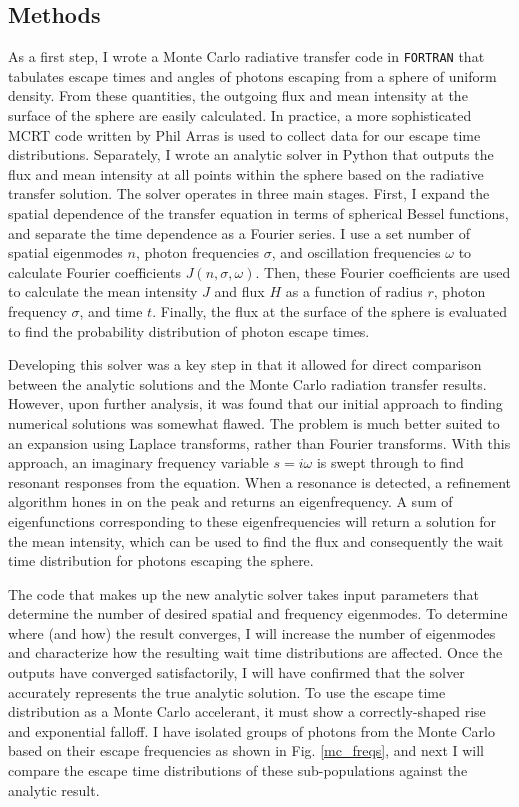 \documentclass[onecolumn]{aastex63}
\begin{document}
\subsection{Methods}

As a first step, I wrote a Monte Carlo radiative transfer code in \texttt{FORTRAN} that tabulates escape times and angles of photons escaping from a sphere of uniform density. From these quantities, the outgoing flux and mean intensity at the surface of the sphere are easily calculated. In practice, a more sophisticated MCRT code written by Phil Arras is used to collect data for our escape time distributions. Separately, I wrote an analytic solver in Python that outputs the flux and mean intensity at all points within the sphere based on the radiative transfer solution. The solver operates in three main stages. First, I expand the spatial dependence of the transfer equation in terms of spherical Bessel functions, and separate the time dependence as a Fourier series. I use a set number of spatial eigenmodes $n$, photon frequencies $\sigma$, and oscillation frequencies $\omega$ to calculate Fourier coefficients $J(n, \sigma, \omega)$. Then, these Fourier coefficients are used to calculate the mean intensity $J$ and flux $H$ as a function of radius $r$, photon frequency $\sigma$, and time $t$. Finally, the flux at the surface of the sphere is evaluated to find the probability distribution of photon escape times.

Developing this solver was a key step in that it allowed for direct comparison between the analytic solutions and the Monte Carlo radiation transfer results. However, upon further analysis, it was found that our initial approach to finding numerical solutions was somewhat flawed. The problem is much better suited to an expansion using Laplace transforms, rather than Fourier transforms. With this approach, an imaginary frequency variable $s = i\omega$ is swept through to find resonant responses from the equation. When a resonance is detected, a refinement algorithm hones in on the peak and returns an eigenfrequency. A sum of eigenfunctions corresponding to these eigenfrequencies will return a solution for the mean intensity, which can be used to find the flux and consequently the wait time distribution for photons escaping the sphere.

The code that makes up the new analytic solver takes input parameters that determine the number of desired spatial and frequency eigenmodes. To determine where (and how) the result converges, I will increase the number of eigenmodes and characterize how the resulting wait time distributions are affected. Once the outputs have converged satisfactorily, I will have confirmed that the solver accurately represents the true analytic solution. To use the escape time distribution as a Monte Carlo accelerant, it must show a correctly-shaped rise and exponential falloff. I have isolated groups of photons from the Monte Carlo based on their escape frequencies as shown in Fig. \ref{mc_freqs}, and next I will compare the escape time distributions of these sub-populations against the analytic result.
\end{document}
